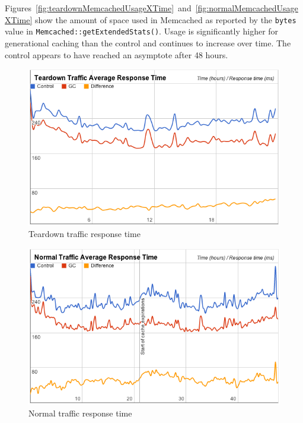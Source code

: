 \documentclass[12pt]{ucthesis}
\begin{document}
Figures~\ref{fig:teardownMemcachedUsageXTime}~and~\ref{fig:normalMemcachedUsageXTime} show the amount of space used in \textsf{Memcached} as reported by the {\tt bytes} value in {\tt Memcached::getExtendedStats()}\cite{memcachedStatsDocs}.
Usage is significantly higher for generational caching than the control and continues to increase over time.
The control appears to have reached an asymptote after 48 hours.

\begin{figure}[htp]
\centering
\includegraphics[width=\textwidth]{assets/teardownRespTimeXTime.png}
\caption{Teardown traffic response time}
\label{fig:teardownRespTimeXTime}
\end{figure}
\begin{figure}[htp]
\centering
\includegraphics[width=\textwidth]{assets/normalRespTimeXTime.png}
\caption{Normal traffic response time}
\label{fig:normalRespTimeXTime}
\end{figure}
\end{document}
